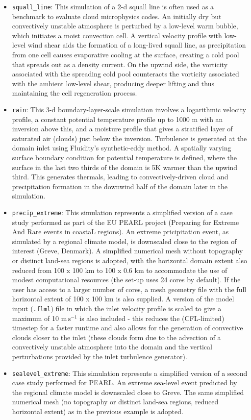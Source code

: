 \documentclass[10pt,a4paper]{article}
\begin{document}
\begin{itemize}
\item \texttt{squall\_line}: This simulation of a 2-d squall line is often used as a benchmark to evaluate cloud microphysics codes. An initially dry but convectively unstable atmosphere is perturbed by a low-level warm bubble, which initiates a moist convection cell. A vertical velocity profile with low-level wind shear aids the formation of a long-lived squall line, as precipitation from one cell causes evaporative cooling at the surface, creating a cold pool that spreads out as a density current. On the upwind side, the vorticity associated with the spreading cold pool counteracts the vorticity associated with the ambient low-level shear, producing deeper lifting and thus maintaining the cell regeneration process.
\item \texttt{rain}: This 3-d boundary-layer-scale simulation involves a logarithmic velocity profile, a constant potential temperature profile up to 1000 m with an inversion above this, and a moisture profile that gives a stratified layer of saturated air (clouds) just below the inversion. Turbulence is generated at the domain inlet using Fluidity's synthetic-eddy method. A spatially varying surface boundary condition for potential temperature is defined, where the surface in the last two thirds of the domain is 5K warmer than the upwind third. This generates thermals, leading to convectively-driven cloud and precipitation formation in the downwind half of the domain later in the simulation.
\item \texttt{precip\_extreme}: This simulation represents a simplified version of a case study performed as part of the EU PEARL project (Preparing for Extreme And Rare events in coastaL regions). An extreme pricipitation event, as simulated by a regional climate model, is downscaled close to the region of interest (Greve, Denmark). A simplified numerical mesh without topography or distinct land-sea regions is adopted, with the horizontal domain extent also reduced from 100 x 100 km to 100 x 0.6 km to accommodate the use of modest computational resources (the set-up uses 24 cores by default). If the user has access to a larger number of cores, a mesh geometry file with the full horizontal extent of 100 x 100 km is also supplied. A version of the model input (\texttt{.flml}) file in which the inlet velocity profile is scaled to give a maximum of 10 $\mathrm{m \, s^{-1}}$ is also included - this reduces the (CFL-limited) timestep for a faster runtime and also allows for the generation of convective clouds closer to the inlet (these clouds form due to the advection of a convectively unstable atmosphere into the domain and the vertical perturbations provided by the inlet turbulence generator).
\item \texttt{sealevel\_extreme}: This simulation represents a simplified version of a second case study performed for PEARL. An extreme sea-level event predicted by the regional climate model is downscaled close to Greve. The same simplified numerical mesh (no topography or distinct land-sea regions, reduced horizontal extent) as in the previous example is adopted.
\end{itemize}
\end{document}
